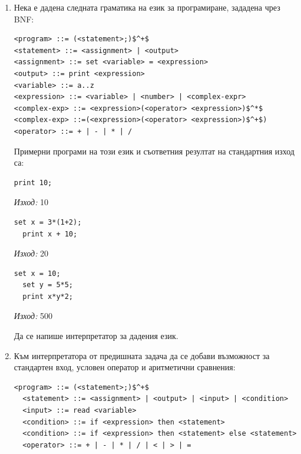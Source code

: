 {\begin{enumerate}[resume]
\begin{flushleft}
  \begin{lstlisting}[mathescape]
begin 
   print 1; 
   print 2; 
   print begin 3; 4; end;
end
  \end{lstlisting}
\end{flushleft}
ще доведе до извеждане на следните редове на стандартния изход: 
\begin{flushleft}
  \begin{lstlisting}[mathescape]
1
2
4
  \end{lstlisting}
\end{flushleft}

\item Нека е дадена следната граматика на език за програмиране, зададена чрез BNF:

\begin{flushleft}
\begin{lstlisting}[mathescape]
<program> ::= (<statement>;)$^+$
<statement> ::= <assignment> | <output>
<assignment> ::= set <variable> = <expression>
<output> ::= print <expression>
<variable> ::= a..z
<expression> ::= <variable> | <number> | <complex-expr>
<complex-exp> ::= <expression>(<operator> <expression>)$^*$ 
<complex-exp> ::=(<expression>(<operator> <expression>)$^+$)
<operator> ::= + | - | * | /
\end{lstlisting}
\end{flushleft}

Примерни програми на този език и съответния резултат на стандартния изход са:
\begin{lstlisting}[mathescape]
  print 10;
\end{lstlisting}
\emph{Изход:} 10

\begin{lstlisting}[mathescape]
  set x = 3*(1+2);
  print x + 10;
\end{lstlisting}
\emph{Изход:} 20

\begin{lstlisting}[mathescape]
  set x = 10;
  set y = 5*5;
  print x*y*2;
\end{lstlisting}
\emph{Изход:} 500

Да се напише интерпретатор за дадения език.

\item Към интерпретатора от предишната задача да се добави възможност за стандартен вход, условен оператор и аритметични сравнения:

\begin{flushleft}
  \begin{lstlisting}[mathescape]
  <program> ::= (<statement>;)$^+$
  <statement> ::= <assignment> | <output> | <input> | <condition>
  <input> ::= read <variable>
  <condition> ::= if <expression> then <statement>
  <condition> ::= if <expression> then <statement> else <statement>
  <operator> ::= + | - | * | / | < | > | =
\end{lstlisting}
\end{flushleft}


\end{enumerate}}
